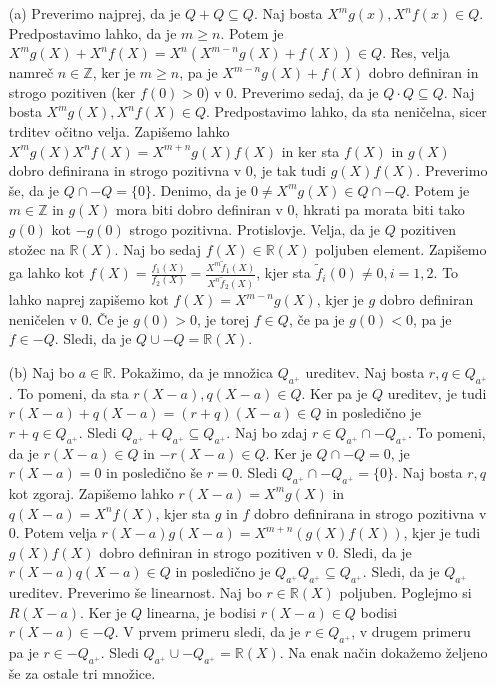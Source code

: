 \documentclass[a4paper, 12pt]{article}
\newcommand{\Z}{\mathbb{Z}}
\newcommand{\R}{\mathbb{R}}
\begin{document}
\begin{enumerate}
\item[(a)] Preverimo najprej, da je $Q+Q \subseteq Q$. Naj bosta $X^m g(x), X^n f(x)\in Q$. Predpostavimo lahko, da je $m\ge n$. Potem je $X^m g(X) + X^n f(X) = X^n (X^{m-n} g(X) + f(X)) \in Q$. Res, velja namreč $n\in \Z$, ker je $m\ge n$, pa je $X^{m-n}g(X) + f(X)$ dobro definiran in strogo pozitiven (ker $f(0)>0$) v $0$. Preverimo sedaj, da je $Q\cdot Q\subseteq Q$. Naj bosta $X^m g(X), X^n f(X) \in Q$. Predpostavimo lahko, da sta neničelna, sicer trditev očitno velja. Zapišemo lahko $X^m g(X) X^n f(X) = X^{m+n} g(X)f(X)$ in ker sta $f(X)$ in $g(X)$ dobro definirana in strogo pozitivna v 0, je tak tudi $g(X)f(X)$. Preverimo še, da je $Q\cap -Q = \{0\}$. Denimo, da je $0\neq X^m g(X) \in Q\cap - Q$. Potem je $m\in\Z$ in $g(X)$ mora biti dobro definiran v $0$, hkrati pa morata biti tako $g(0)$ kot $-g(0)$ strogo pozitivna. Protislovje. Velja, da je $Q$ pozitiven stožec na $\R(X)$. Naj bo sedaj $f(X)\in \R(X)$ poljuben element. Zapišemo ga lahko kot $f(X) = \frac{f_1(X)}{f_2(X)} = \frac{X^m \tilde{f}_1(X)}{X^n \tilde{f}_2(X)}$, kjer sta $\tilde{f}_i(0)\neq 0, i=1,2$. To lahko naprej zapišemo kot $f(X) = X^{m-n} g(X)$, kjer je $g$ dobro definiran neničelen v 0.  Če je $g(0) > 0$, je torej $f\in Q$, če pa je $g(0)< 0$, pa je $f\in -Q$. Sledi, da je $Q\cup -Q = \R(X)$.

\item[(b)] Naj bo $a\in\R$. Pokažimo, da je množica $Q_{a^+}$ ureditev. Naj bosta $r,q\in Q_{a^+}$. To pomeni, da sta $r(X-a),q(X-a)\in Q$. Ker pa je $Q$ ureditev, je tudi $r(X-a) + q(X-a) = (r+q)(X-a)\in Q$ in posledično je $r+q \in Q_{a^+}$. Sledi $Q_{a^+} + Q_{a^+} \subseteq Q_{a^+}$. Naj bo zdaj $r\in Q_{a^+} \cap -Q_{a^+}$. To pomeni, da je $r(X-a) \in Q$ in $-r(X-a) \in Q$. Ker je $Q\cap -Q = 0$, je $r(X-a) = 0$ in posledično še $r=0$. Sledi $Q_{a^+} \cap -Q_{a^+} = \{0\}$. Naj bosta $r,q$ kot zgoraj. Zapišemo lahko $r(X-a) = X^m g(X)$ in $q(X-a) = X^n f(X)$, kjer sta $g$ in $f$ dobro definirana in strogo pozitivna v 0. Potem velja $r(X-a)g(X-a) = X^{m+n} (g(X) f(X))$, kjer je tudi $g(X)f(X)$ dobro definiran in strogo pozitiven v 0. Sledi, da je $r(X-a)q(X-a)\in Q$ in posledično je $Q_{a^+} Q_{a^+} \subseteq Q_{a^+}$. Sledi, da je $Q_{a^+}$ ureditev. Preverimo še linearnost. Naj bo $r\in \R(X)$ poljuben. Poglejmo si $R(X-a)$. Ker je $Q$ linearna, je bodisi $r(X-a) \in Q$ bodisi $r(X-a) \in -Q$. V prvem primeru sledi, da je $r\in Q_{a^+}$, v drugem primeru pa je $r\in -Q_{a^+}$. Sledi $Q_{a^+} \cup -Q_{a^+} = \R(X)$. Na enak način dokažemo željeno še za ostale tri množice.


\end{enumerate}
\end{document}

